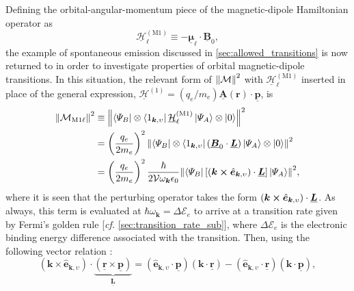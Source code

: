 Defining the orbital-angular-momentum piece of the magnetic-dipole Hamiltonian operator as 
\begin{equation}
 \underline{\mathcal{H}}^{(\text{M}1)}_{\ell} \equiv - \underline{\mathbold{\mu}}_{\ell} \cdot \underline{\mathbold{B}}_0 ,
 \end{equation}
the example of spontaneous emission discussed in \cref{sec:allowed_transitions} is now returned to in order to investigate properties of orbital magnetic-dipole transitions. 
In this situation, the relevant form of $\norm{\mathcal{M}}^2$ with $\underline{\mathcal{H}}^{(\text{M}1)}_{\ell}$ inserted in place of the general expression, $\underline{\mathcal{H}}^{(1)} = (q_e / m_e) \underline{\mathbold{A}} ( \mathbold{r} ) \cdot \underline{\mathbold{p}}$, is 
\begin{align}
 \begin{split}
 \norm{\mathcal{M}_{\text{M}1 \ell}}^2 &\equiv \norm{\bra{\Psi_B} \otimes \bra{1_{\mathbold{k},\upsilon} } \underline{\mathcal{H}}^{(\text{M}1)}_{\ell} \ket{\Psi_A} \otimes \ket{0}}^2 \\
 &= \left( \frac{q_e}{2 m_e} \right)^2 \norm{\bra{\Psi_B} \otimes \bra{1_{\mathbold{k},\upsilon} } \left( \underline{\mathbold{B}}_0 \cdot \underline{\mathbold{L}} \right) \ket{\Psi_A} \otimes \ket{0}}^2 \\
 &= \left( \frac{q_e}{2 m_e} \right)^2 \frac{\hbar}{2 \mathcal{V} \omega_{\mathbold{k}} \epsilon_0} \norm{\bra{\Psi_B} \left[ \left( \mathbold{k} \cross \hat{\mathbold{e}}_{\mathbold{k},\upsilon} \right) \cdot \underline{\mathbold{L}} \right] \ket{\Psi_A}}^2 , 
 \end{split} 
 \end{align}
where it is seen that the perturbing operator takes the form $\left( \mathbold{k} \cross \hat{\mathbold{e}}_{\mathbold{k},\upsilon} \right) \cdot \underline{\mathbold{L}}$. 
As always, this term is evaluated at $\hbar \omega_{\mathbold{k}} = \Delta \mathcal{E}_e$ to arrive at a transition rate given by Fermi's golden rule [\emph{cf.\@} \cref{sec:transition_rate_sub}], where $\Delta \mathcal{E}_e$ is the electronic binding energy difference associated with the transition. 
Then, using the following vector relation \cite{Townsend00}:
\begin{equation}\label{eq:mag_dipole_vector_trick}
 \left( \mathbold{k} \times \hat{\mathbold{e}}_{\mathbold{k},\upsilon} \right) \cdot \underbrace{\left( \underline{\mathbold{r}} \times \underline{\mathbold{p}} \right)}_{\underline{\mathbold{L}}} =  \left( \hat{\mathbold{e}}_{\mathbold{k},\upsilon} \cdot \underline{\mathbold{p}} \right) \left( \mathbold{k} \cdot \underline{\mathbold{r}} \right) - \left( \hat{\mathbold{e}}_{\mathbold{k},\upsilon} \cdot \underline{\mathbold{r}} \right) \left( \mathbold{k} \cdot \underline{\mathbold{p}} \right) ,
 \end{equation}
